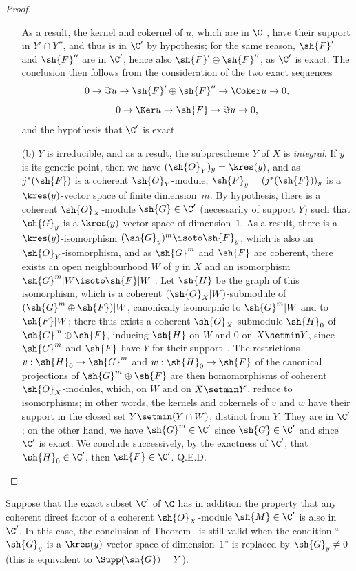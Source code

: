 \begin{proof}
\begin{enumerate}
    As a result, the kernel and cokernel of $u$, which are in $\C$ , have their support in $Y'\cap Y''$, and thus is in $\C'$ by hypothesis; for the same reason, $\sh{F}'$ and $\sh{F}''$ are in $\C'$, hence also $\sh{F}'\oplus\sh{F}''$, as $\C'$ is exact.
    The conclusion then follows from the consideration of the two exact sequences
    \[
      0\to\Im u\to\sh{F}'\oplus\sh{F}''\to\Coker u\to 0,
    \]
    \[
      0\to\Ker u\to\sh{F}\to\Im u\to 0,
    \]
    and the hypothesis that $\C'$ is exact.
  \item[(b)] $Y$ is irreducible, and as a result, the subprescheme $Y$ of $X$ is \emph{integral}.
    If $y$ is its generic point, then we have $(\sh{O}_Y)_y=\kres(y)$, and as $j^*(\sh{F})$ is a coherent $\sh{O}_Y$-module, $\sh{F}_y=(j^*(\sh{F}))_y$ is a $\kres(y)$-vector space of finite dimension~$m$.
    By hypothesis, there is a coherent $\sh{O}_X$-module $\sh{G}\in\C'$ (necessarily of support $Y$) such that $\sh{G}_y$ is a $\kres(y)$-vector space of dimension~$1$.
    As a result, there is a $\kres(y)$-isomorphism $(\sh{G}_y)^m\isoto\sh{F}_y$, which is also an $\sh{O}_Y$-isomorphism, and as $\sh{G}^m$ and $\sh{F}$ are coherent, there exists an open neighbourhood $W$ of $y$ in $X$ and an isomorphism $\sh{G}^m|W\isoto\sh{F}|W$ .
    Let $\sh{H}$ be the graph of this isomorphism, which is a coherent $(\sh{O}_X|W)$-submodule of $(\sh{G}^m\oplus\sh{F})|W$, canonically isomorphic to $\sh{G}^m|W$ and to $\sh{F}|W$; there thus exists a coherent $\sh{O}_X$-submodule $\sh{H}_0$ of $\sh{G}^m\oplus\sh{F}$, inducing $\sh{H}$ on $W$ and $0$ on $X\setmin Y$, since $\sh{G}^m$ and $\sh{F}$ have $Y$ for their support~.
    The restrictions $v:\sh{H}_0\to\sh{G}^m$ and $w:\sh{H}_0\to\sh{F}$ of the canonical projections of $\sh{G}^m\oplus\sh{F}$ are then homomorphisms of coherent $\sh{O}_X$-modules, which, on $W$ and on $X\setmin Y$, reduce to isomorphisms; in other words, the kernels and cokernels of $v$ and $w$ have their support in the closed set $Y\setmin(Y\cap W)$, distinct from $Y$.
    They are in $\C'$; on the other hand, we have $\sh{G}^m\in\C'$ since $\sh{G}\in\C'$ and since $\C'$ is exact.
    We conclude successively, by the exactness of $\C'$, that $\sh{H}_0\in\C'$, then $\sh{F}\in\C'$.
Q.E.D.
\end{enumerate}
\end{proof}

\begin{corollary}[3.1.3]
\label{III.3.1.3}
Suppose that the exact subset $\C'$ of $\C$ has in addition the property that any coherent direct factor of a coherent $\sh{O}_X$-module $\sh{M}\in\C'$ is also in $\C'$.
In this case, the conclusion of Theorem~ is still valid when the condition ``$\sh{G}_y$ is a $\kres(y)$-vector space of dimension~$1$'' is replaced by $\sh{G}_y\neq 0$ (this is equivalent to $\Supp(\sh{G})=Y$).
\end{corollary}

